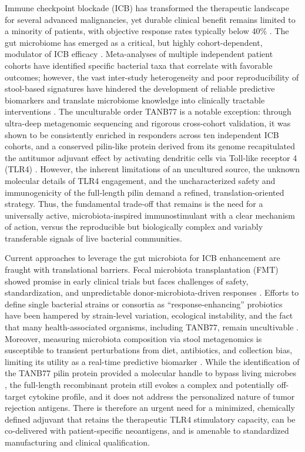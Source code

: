 \documentclass{article}
\begin{document}
Immune checkpoint blockade (ICB) has transformed the therapeutic landscape for several advanced malignancies, yet durable clinical benefit remains limited to a minority of patients, with objective response rates typically below 40\% \cite{routy2018gut, gopalakrishnan2018gut, matson2018commensal}. The gut microbiome has emerged as a critical, but highly cohort-dependent, modulator of ICB efficacy \cite{helmink2019microbiome}. Meta-analyses of multiple independent patient cohorts have identified specific bacterial taxa that correlate with favorable outcomes; however, the vast inter-study heterogeneity and poor reproducibility of stool-based signatures have hindered the development of reliable predictive biomarkers and translate microbiome knowledge into clinically tractable interventions \cite{lee2023tanb77}. The unculturable order TANB77 is a notable exception: through ultra-deep metagenomic sequencing and rigorous cross-cohort validation, it was shown to be consistently enriched in responders across ten independent ICB cohorts, and a conserved pilin-like protein derived from its genome recapitulated the antitumor adjuvant effect by activating dendritic cells via Toll-like receptor 4 (TLR4) \cite{lee2023tanb77}. However, the inherent limitations of an uncultured source, the unknown molecular details of TLR4 engagement, and the uncharacterized safety and immunogenicity of the full-length pilin demand a refined, translation-oriented strategy. Thus, the fundamental trade-off that remains is the need for a universally active, microbiota-inspired immunostimulant with a clear mechanism of action, versus the reproducible but biologically complex and variably transferable signals of live bacterial communities.

Current approaches to leverage the gut microbiota for ICB enhancement are fraught with translational barriers. Fecal microbiota transplantation (FMT) showed promise in early clinical trials but faces challenges of safety, standardization, and unpredictable donor-microbiota-driven responses \cite{routy2023fmt}. Efforts to define single bacterial strains or consortia as “response-enhancing” probiotics have been hampered by strain-level variation, ecological instability, and the fact that many health-associated organisms, including TANB77, remain uncultivable \cite{matson2018commensal, helmink2019microbiome}. Moreover, measuring microbiota composition via stool metagenomics is susceptible to transient perturbations from diet, antibiotics, and collection bias, limiting its utility as a real-time predictive biomarker \cite{gopalakrishnan2018gut}. While the identification of the TANB77 pilin protein provided a molecular handle to bypass living microbes \cite{lee2023tanb77}, the full-length recombinant protein still evokes a complex and potentially off-target cytokine profile, and it does not address the personalized nature of tumor rejection antigens. There is therefore an urgent need for a minimized, chemically defined adjuvant that retains the therapeutic TLR4 stimulatory capacity, can be co-delivered with patient-specific neoantigens, and is amenable to standardized manufacturing and clinical qualification.
\end{document}
